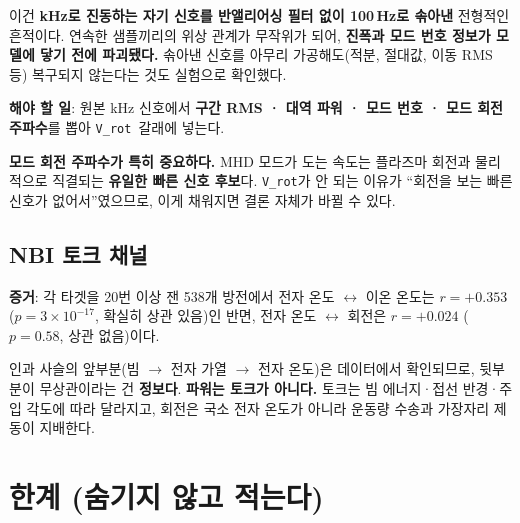 \documentclass[10pt]{article}
\newcommand{\Vrot}{\texttt{V\_rot}}
\begin{document}
이건 \textbf{kHz로 진동하는 자기 신호를 반앨리어싱 필터 없이 100\,Hz로 솎아낸} 전형적인
흔적이다. 연속한 샘플끼리의 위상 관계가 무작위가 되어, \textbf{진폭과 모드 번호 정보가
모델에 닿기 전에 파괴됐다.} 솎아낸 신호를 아무리 가공해도(적분, 절대값, 이동 RMS 등)
복구되지 않는다는 것도 실험으로 확인했다.

\textbf{해야 할 일}: 원본 kHz 신호에서 \textbf{구간 RMS · 대역 파워 · 모드 번호 · 모드 회전
주파수}를 뽑아 \Vrot\ 갈래에 넣는다.

\textbf{모드 회전 주파수가 특히 중요하다.} MHD 모드가 도는 속도는 플라즈마 회전과 물리적으로
직결되는 \textbf{유일한 빠른 신호 후보}다. \Vrot 가 안 되는 이유가 ``회전을 보는 빠른 신호가
없어서''였으므로, 이게 채워지면 결론 자체가 바뀔 수 있다.

\subsection{NBI 토크 채널}

\textbf{증거}: 각 타겟을 20번 이상 잰 538개 방전에서 전자 온도 $\leftrightarrow$ 이온 온도는
\textbf{$r = +0.353$} ($p = 3 \times 10^{-17}$, 확실히 상관 있음)인 반면, 전자 온도
$\leftrightarrow$ 회전은 \textbf{$r = +0.024$} ($p = 0.58$, 상관 없음)이다.

인과 사슬의 앞부분(빔 $\rightarrow$ 전자 가열 $\rightarrow$ 전자 온도)은 데이터에서
확인되므로, 뒷부분이 무상관이라는 건 \textbf{정보다}. \textbf{파워는 토크가 아니다.} 토크는
빔 에너지·접선 반경·주입 각도에 따라 달라지고, 회전은 국소 전자 온도가 아니라 운동량 수송과
가장자리 제동이 지배한다.

\section{한계 (숨기지 않고 적는다)}
\end{document}
